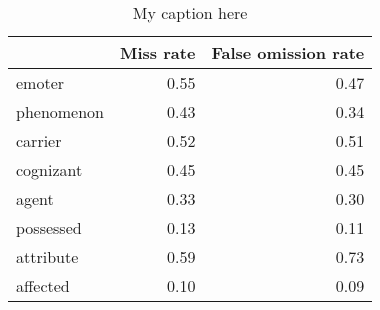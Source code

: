\begin{table}[!ht]
\centering
\begin{tabular}{lrr}
\toprule
{} &  Miss rate &  False omission rate \\
\midrule
emoter     &       0.55 &                 0.47 \\
phenomenon &       0.43 &                 0.34 \\
carrier    &       0.52 &                 0.51 \\
cognizant  &       0.45 &                 0.45 \\
agent      &       0.33 &                 0.30 \\
possessed  &       0.13 &                 0.11 \\
attribute  &       0.59 &                 0.73 \\
affected   &       0.10 &                 0.09 \\
\bottomrule
\end{tabular}
\caption{My caption here}
\label{tab:PARTICIPANT_ROLE-oe-combined-errors}
\end{table}